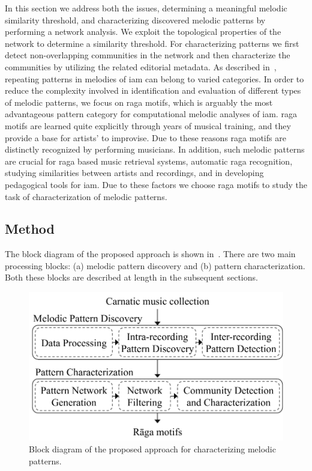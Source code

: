 {In this section we address both the issues, determining a meaningful melodic similarity threshold, and characterizing discovered melodic patterns by performing a network analysis. We exploit the topological properties of the network to determine a similarity threshold. For characterizing patterns we first detect non-overlapping communities in the network and then characterize the communities by utilizing the related editorial metadata. As described in~, repeating patterns in melodies of \gls{iam} can belong to varied categories. In order to reduce the complexity involved in identification and evaluation of different types of melodic patterns, we focus on \gls{raga} motifs, which is arguably the most advantageous pattern category for computational melodic analyses of \gls{iam}. \Gls{raga} motifs are learned quite explicitly through years of musical training, and they provide a base for artists' to improvise. Due to these reasons \gls{raga} motifs are distinctly recognized by performing musicians. In addition, such melodic patterns are crucial for \gls{raga} based music retrieval systems, automatic \gls{raga} recognition, studying similarities between artists and recordings, and in developing pedagogical tools for \gls{iam}. Due to these factors we choose \gls{raga} motifs to study the task of characterization of melodic patterns.  


\subsection{Method}

The block diagram of the proposed approach is shown in~. There are two main processing blocks: (a) melodic pattern discovery and (b) pattern characterization. Both these blocks are described at length in the subsequent sections.

\begin{figure}
	\begin{center}
		\includegraphics[width=\figSizeEighty]{ch06_patterns/figures/Characterization/blockDiagram.pdf}
	\end{center}
	\caption{Block diagram of the proposed approach for characterizing melodic patterns.}
	\label{fig:block_diagram_characterization}
\end{figure}


}
